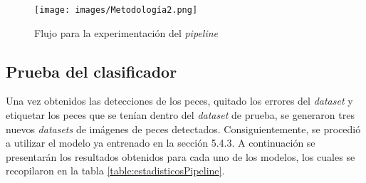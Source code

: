 \begin{figure}[h!]
\centering
\texttt{[image: images/Metodología2.png]}
\caption{Flujo para la experimentación del \textit{pipeline}}
\label{fig:metodologia2}
\end{figure}

\subsection{Prueba del clasificador}

Una vez obtenidos las detecciones de los peces, quitado los errores del \textit{dataset} y etiquetar los peces que se tenían dentro del \textit{dataset} de prueba, se generaron tres nuevos \textit{datasets} de imágenes de peces detectados. Consiguientemente, se procedió a utilizar el modelo ya entrenado en la sección 5.4.3. 
A continuación se presentarán los resultados obtenidos para cada uno de los modelos, los cuales se recopilaron en la tabla \ref{table:estadisticosPipeline}.

